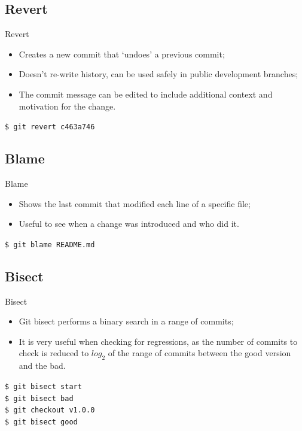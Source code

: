 \documentclass{beamer}
\begin{document}
\subsection{Revert}
\begin{frame}{Revert}
  \begin{itemize}
    \item Creates a new commit that `undoes' a previous commit;
    \item Doesn't re-write history, can be used safely in public development branches;
    \item The commit message can be edited to include additional context and motivation for the change.
  \end{itemize}
  \begin{block}{}
    \texttt{\$ git revert c463a746}
  \end{block}
\end{frame}

\subsection{Blame}
\begin{frame}{Blame}
  \begin{itemize}
    \item Shows the last commit that modified each line of a specific file;
    \item Useful to see when a change was introduced and who did it.
  \end{itemize}
  \begin{block}{}
    \texttt{\$ git blame README.md}
  \end{block}
\end{frame}

\subsection{Bisect}
\begin{frame}{Bisect}
  \begin{itemize}
    \item Git bisect performs a binary search in a range of commits;
    \item It is very useful when checking for regressions, as the number of commits to check is reduced to $log_2$ of the range of commits between the good version and the bad.
  \end{itemize}
  \begin{block}{}
    \texttt{\$ git bisect start} \\
    \texttt{\$ git bisect bad} \\
    \texttt{\$ git checkout v1.0.0} \\
    \texttt{\$ git bisect good}
  \end{block}
\end{frame}
\end{document}

